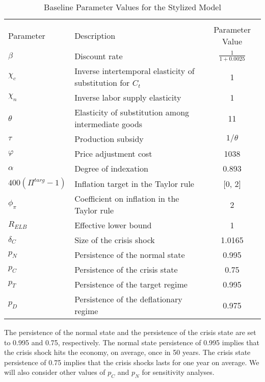 \documentclass[11pt]{article}
\begin{document}
	\begin{table}[!htp]
		{\small
			\begin{center}
				\caption{Baseline Parameter Values for the Stylized Model\label{tab:ParameterValues_Basic}}
				\vspace{-1.5em}
				\begin{tabular}{llc}
					\multicolumn{3}{c}{}\\
					Parameter & Description  & Parameter Value  \\
					\hline
					\hline
					$\beta$      & Discount rate & $\frac{1}{1+0.0025}$ \\
					$\chi_{c}$   & Inverse intertemporal elasticity of substitution for $C_{t}$ & 1\\
					$\chi_{n}$   & Inverse labor supply elasticity & 1  \\
					$\theta$     & Elasticity of substitution among intermediate goods & 11 \\
					$\tau$       & Production subsidy & $1/\theta$\\
					$\varphi$    & Price adjustment cost & 1038\\
					$\alpha$     & Degree of indexation & 0.893\\
					\hline
					$400(\Pi^{targ}-1)$ & Inflation target in the Taylor rule & [0, 2]\\
					$\phi_{\pi}$ & Coefficient on inflation in the Taylor rule & 2\\
					$R_{ELB}$    & Effective lower bound & 1\\
					\hline
					$\delta_{C}$ & Size of the crisis shock & 1.0165\\
					$p_{N}$ & Persistence of the normal state  & 0.995\\  
					$p_{C}$ & Persistence of the crisis state     & 0.75\\
					\hline
					$p_{T}$ & Persistence of the target regime     & 0.995\\  
					$p_{D}$ & Persistence of the deflationary regime & 0.975\\
					\hline
					\hline
				\end{tabular}
			\end{center}
		}
		\vspace{-0.5em}
	\end{table}
	
	The persistence of the normal state and the persistence of the crisis state are set to 0.995 and 0.75, respectively. The normal state persistence of 0.995 implies that the crisis shock hits the economy, on average, once in 50 years. The crisis state persistence of 0.75 implies that the crisis shocks lasts for one year on average. We will also consider other values of $p_{C}$ and $p_{N}$ for sensitivity analyses.
	
\end{document}
